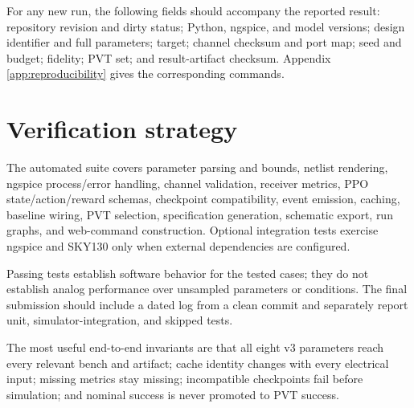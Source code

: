 For any new run, the following fields should accompany the reported result:
repository revision and dirty status; Python, ngspice, and model versions;
design identifier and full parameters; target; channel checksum and port map;
seed and budget; fidelity; PVT set; and result-artifact checksum. Appendix
\ref{app:reproducibility} gives the corresponding commands.

\section{Verification strategy}

The automated suite covers parameter parsing and bounds, netlist rendering,
ngspice process/error handling, channel validation, receiver metrics, PPO
state/action/reward schemas, checkpoint compatibility, event emission, caching,
baseline wiring, PVT selection, specification generation, schematic export, run
graphs, and web-command construction. Optional integration tests exercise
ngspice and SKY130 only when external dependencies are configured.

Passing tests establish software behavior for the tested cases; they do not
establish analog performance over unsampled parameters or conditions. The final
submission should include a dated log from a clean commit and separately report
unit, simulator-integration, and skipped tests.

The most useful end-to-end invariants are that all eight v3 parameters reach
every relevant bench and artifact; cache identity changes with every electrical
input; missing metrics stay missing; incompatible checkpoints fail before
simulation; and nominal success is never promoted to PVT success.
